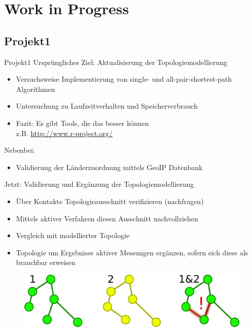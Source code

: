 \documentclass[ngerman,compress,hyperref={bookmarks}]{beamer}
\begin{document}
\section{Work in Progress}
\subsection{Projekt1}
\begin{frame}[allowframebreaks]{Projekt1}
  Ursprüngliches Ziel: Aktualisierung der Topologiemodellierung
  \begin{itemize}
    \item Versuchsweise Implementierung von single- und all-pair-shortest-path Algorithmen
    \item Untersuchung zu Laufzeitverhalten und Speicherverbrauch
    \item Fazit: Es gibt Tools, die das besser können\\
    \hspace{0.3cm}z.B. \url{http://www.r-project.org/}
  \end{itemize}
  Nebenbei:
  \begin{itemize}
    \item Validierung der Länderzuordnung mittels GeoIP Datenbank
  \end{itemize}
  \framebreak

  Jetzt: Validierung und Ergänzung der Topologiemodellierung
  \begin{itemize}
    \item Über Kontakte Topologieausschnitt verifizieren (nachfragen)
    \item Mittels aktiver Verfahren diesen Ausschnitt nachvollziehen
    \item Vergleich mit modellierter Topologie
    \item Topologie um Ergebnisse aktiver Messungen ergänzen, sofern sich diese als brauchbar erweisen
  \end{itemize}
  \begin{figure}
    \label{graph_diff}
    \includegraphics[width=.75\textwidth]{images/graph_diff}
  \end{figure}
\end{frame}
\end{document}
